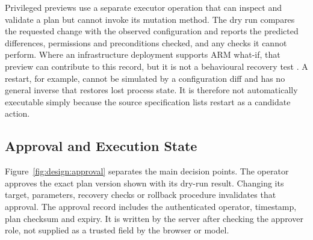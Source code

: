 Privileged previews use a separate executor operation that can inspect
and validate a plan but cannot invoke its mutation method. The dry run
compares the requested change with the observed configuration
and reports the predicted differences, permissions and preconditions
checked, and any checks it cannot perform. Where an infrastructure
deployment supports ARM what-if, that preview can contribute to this
record, but it is not a behavioural recovery test
\parencite{microsoft2026whatif}. A restart, for example, cannot be simulated
by a configuration diff and has no general inverse that restores lost
process state. It is therefore not automatically executable simply because
the source specification lists restart as a candidate action.


\subsection{Approval and Execution State}

Figure~\ref{fig:design:approval} separates the main decision points. The
operator approves the exact plan version shown with its dry-run result.
Changing its target, parameters, recovery checks or rollback procedure
invalidates that approval. The approval record includes the authenticated
operator, timestamp, plan checksum and expiry. It is written by the
server after checking the approver role, not supplied as a trusted field
by the browser or model.

